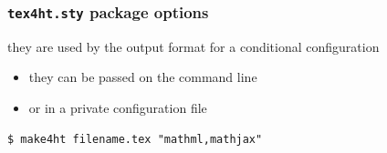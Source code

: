 \begin{frame}[fragile]
  \frametitle{\texttt{tex4ht.sty} package options}
    they are used by the output format for a conditional configuration

  \begin{itemize}
    \item they can be passed on the command line
    \item or in a private configuration file 
  \end{itemize}
  \begin{priklad}
\begin{verbatim}
$ make4ht filename.tex "mathml,mathjax"
\end{verbatim}
\end{priklad}
\end{frame}
